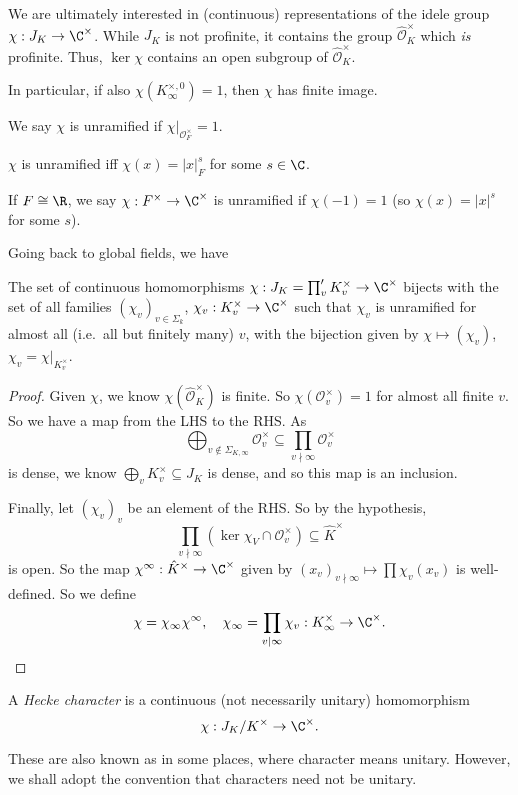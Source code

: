 \documentclass[a4paper]{article}
\begin{document}
We are ultimately interested in (continuous) representations of the idele group $\chi: J_K \to \C^\times$. While $J_K$ is not profinite, it contains the group $\hat{\mathcal{O}}_K^\times$ which \emph{is} profinite. Thus, $\ker \chi$ contains an open subgroup of $\hat{\mathcal{O}}_K^\times$.

In particular, if also $\chi(K_\infty^{\times, 0}) = 1$, then $\chi$ has finite image.

We say $\chi$ is unramified if $\chi|_{\mathcal{O}_F^\times} = 1$.
\begin{ex}
  $\chi$ is unramified iff $\chi(x) = |x|_F^s$ for some $s \in \C$.
\end{ex}

If $F \cong \R$, we say $\chi: F^\times \to \C^\times$ is unramified if $\chi(-1) = 1$ (so $\chi(x) = |x|^s$ for some $s$).

Going back to global fields, we have
\begin{prop}
  The set of continuous homomorphisms $\chi: J_K = \prod_v' K_v^\times \to \C^\times$ bijects with the set of all families $(\chi_v)_{v \in \Sigma_k}$, $\chi_v: K_v^\times \to \C^\times$ such that $\chi_v$ is unramified for almost all (i.e.\ all but finitely many) $v$, with the bijection given by $\chi \mapsto (\chi_v)$, $\chi_v = \chi|_{K_v^\times}$.
\end{prop}

\begin{proof}
  Given $\chi$, we know $\chi(\hat{\mathcal{O}}_K^\times)$ is finite. So $\chi(\mathcal{O}_v^\times) = 1$ for almost all finite $v$. So we have a map from the LHS to the RHS. As
  \[
    \bigoplus_{v \not \in \Sigma_{K, \infty}} \mathcal{O}_v^\times \subseteq \prod_{v \nmid \infty} \mathcal{O}_v^\times
  \]
  is dense, we know $\bigoplus_v K_v^\times \subseteq J_K$ is dense, and so this map is an inclusion.

  Finally, let $(\chi_v)_v$ be an element of the RHS. So by the hypothesis,
  \[
    \prod_{v \nmid \infty} (\ker \chi_V \cap \mathcal{O}_v^\times) \subseteq \hat{K}^\times
  \]
  is open. So the map $\chi^\infty: \hat{K}^\times \to \C^\times$ given by $(x_v)_{v \nmid \infty} \mapsto \prod \chi_v(x_v)$ is well-defined. So we define
  \[
    \chi = \chi_\infty \chi^\infty,\quad \chi_\infty = \prod_{v \mid \infty} \chi_v: K_\infty^\times \to \C^\times.\qedhere
  \]
\end{proof}

\begin{defi}
  A \emph{Hecke character} is a continuous (not necessarily unitary) homomorphism
  \[
    \chi: J_K/K^\times \to \C^\times.
  \]
\end{defi}
These are also known as  in some places, where character means unitary. However, we shall adopt the convention that characters need not be unitary.
\end{document}
